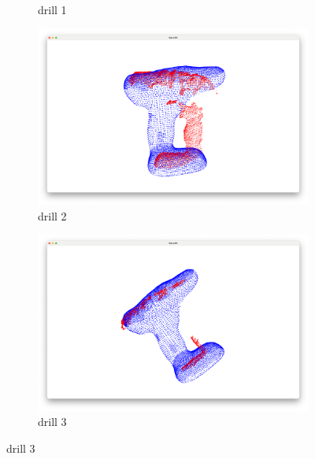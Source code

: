 \documentclass[conference]{IEEEtran}
\begin{document}
\begin{figure}
\begin{subfigure}{0.24\textwidth}
        \caption{drill 1}
        \label{fig:drill_1}
    \end{subfigure}
    \hfill
    \begin{subfigure}{0.24\textwidth}
        \includegraphics[width=\linewidth]{../code/icp_warm_up/drill_2.png}
        \caption{drill 2}
        \label{fig:drill_2}
    \end{subfigure}
    \hfill
    \begin{subfigure}{0.24\textwidth}
        \includegraphics[width=\linewidth]{../code/icp_warm_up/drill_3.png}
        \caption{drill 3}
        \label{fig:drill_3}
    \end{subfigure}
    

\end{figure}
\end{document}
